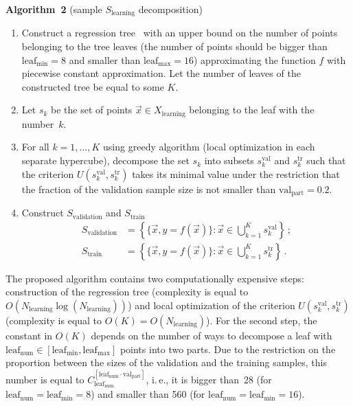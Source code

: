 \begin{multicols}{2}
\medskip

\noindent
\textbf{Algorithm~2} (sample $S_{\mathrm{learning}}$ decomposition) %
\ 
\noindent
  \begin{enumerate}
    \item {Construct a regression tree~\cite{CART} with an upper 
    bound on the number of points belonging to the tree leaves (the 
    number of points should be bigger than $\mathrm{leaf}_{\min} = 8$ and smaller than 
    $\mathrm{leaf}_{\max}=16$) approximating the function $f$ with piecewise constant approximation}. 
{Let the number of leaves of the constructed tree be equal to some $K$}. 
    \item {Let $s_k$ be the set of points 
    $\vec x \in X_{\mathrm{learning}}$ belonging to the leaf with the number~$k$}.
    \item {For all $k = 1, \dots, K$ using greedy algorithm (local optimization 
    in each separate hypercube),  decompose the set $s_k$ into subsets $s_k^{\mathrm{val}}$ and 
    $s_k^{\mathrm{tr}}$ such that the criterion  $U(s_k^{\mathrm{val}}, s_k^{\mathrm{tr}})$ takes its minimal 
    value under the restriction 
    that the fraction of the validation sample size is not smaller than $\mathrm{val}_{\mathrm{part}} = 0.2$}.
    \item {Construct $S_{\mathrm{validation}}$ and} $S_{\mathrm{train}}$
\begin{align*}
S_{\mathrm{validation}} &= \left\{ \{\vec x, y = f(\vec x)\}: \vec x \in 
\bigcup\limits_{k=1}^K  s_k^{\mathrm{val}} \right \}\,; \\
S_{\mathrm{train}} &= \left\{ \{\vec x, y = f(\vec x)\}: \vec x \in 
\bigcup\limits_{k=1}^K  s_k^{\mathrm{tr}} \right \}\,.
\end{align*}
  \end{enumerate}


\medskip

The proposed algorithm contains two computationally expensive steps: 
construction of the regression tree (complexity is equal to 
$O(N_{\mathrm{learning}}\log(N_{\mathrm{learning}}))$)
and local optimization of the criterion $U(s_k^{\mathrm{val}}, s_k^{\mathrm{tr}})$ 
(complexity is equal to $O(K) = O(N_{\mathrm{learning}})$).
For the second step, the constant in
 $O(K)$ depends on the number of ways to decompose a leaf with 
 $\mathrm{leaf}_{\mathrm{num}}$\linebreak $\in [\mathrm{leaf}_{\min}, \mathrm{leaf}_{\max}]$ points into two parts. 
 Due to the restriction on the proportion
 between the sizes of the validation and the training samples,
  this number is equal to
 $C_{\mathrm{leaf}_{\mathrm{num}}}^{[\mathrm{leaf}_{\mathrm{num}}
 \cdot \mathrm{val}_{\mathrm{part}}]}$, i.\,e., it is bigger than~28 
 (for $\mathrm{leaf}_{\mathrm{num}} = \mathrm{leaf}_{\min} = 8$) and smaller than 560 (for 
  $\mathrm{leaf}_{\mathrm{num}} = \mathrm{leaf}_{\min} = 16$). 
  

\end{multicols}
